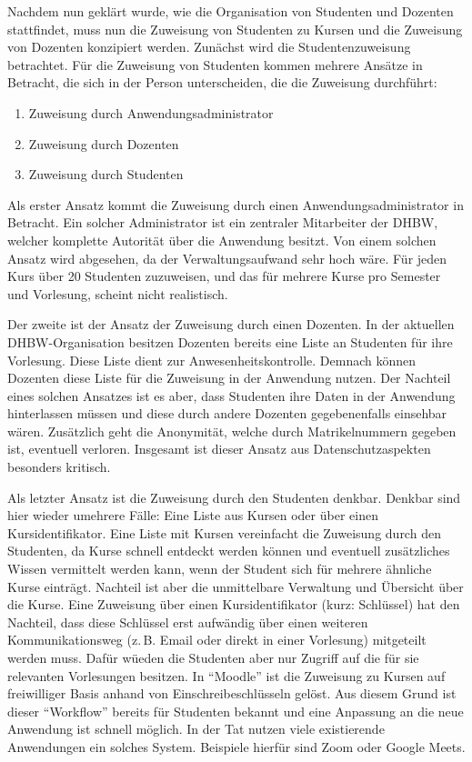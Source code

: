 Nachdem nun geklärt wurde, wie die Organisation von Studenten und Dozenten stattfindet, muss nun die Zuweisung von Studenten zu Kursen und die Zuweisung von Dozenten konzipiert werden.
Zunächst wird die Studentenzuweisung betrachtet.
Für die Zuweisung von Studenten kommen mehrere Ansätze in Betracht, die sich in der Person unterscheiden, die die Zuweisung durchführt:
\begin{enumerate}
    \item Zuweisung durch Anwendungsadministrator
    \item Zuweisung durch Dozenten
    \item Zuweisung durch Studenten
\end{enumerate}
Als erster Ansatz kommt die Zuweisung durch einen Anwendungsadministrator in Betracht.
Ein solcher Administrator ist ein zentraler Mitarbeiter der DHBW, welcher komplette Autorität über die Anwendung besitzt.
Von einem solchen Ansatz wird abgesehen, da der Verwaltungsaufwand sehr hoch wäre.
Für jeden Kurs über 20 Studenten zuzuweisen, und das für mehrere Kurse pro Semester und Vorlesung, scheint nicht realistisch.

Der zweite ist der Ansatz der Zuweisung durch einen Dozenten.
In der aktuellen DHBW-Organisation besitzen Dozenten bereits eine Liste an Studenten für ihre Vorlesung.
Diese Liste dient zur Anwesenheitskontrolle.
Demnach können Dozenten diese Liste für die Zuweisung in der Anwendung nutzen.
Der Nachteil eines solchen Ansatzes ist es aber, dass Studenten ihre Daten in der Anwendung hinterlassen müssen und diese durch andere Dozenten gegebenenfalls einsehbar wären.
Zusätzlich geht die Anonymität, welche durch Matrikelnummern gegeben ist, eventuell verloren.
Insgesamt ist dieser Ansatz aus Datenschutzaspekten besonders kritisch. %

Als letzter Ansatz ist die Zuweisung durch den Studenten denkbar.
Denkbar sind hier wieder umehrere Fälle: Eine Liste aus Kursen oder über einen Kursidentifikator.
Eine Liste mit Kursen vereinfacht die Zuweisung durch den Studenten, da Kurse schnell entdeckt werden können und eventuell zusätzliches Wissen vermittelt werden kann, wenn der Student sich für mehrere ähnliche Kurse einträgt.
Nachteil ist aber die unmittelbare Verwaltung und Übersicht über die Kurse.
Eine Zuweisung über einen Kursidentifikator (kurz: Schlüssel) hat den Nachteil, dass diese Schlüssel erst aufwändig über einen weiteren Kommunikationsweg (z.\,B. Email oder direkt in einer Vorlesung) mitgeteilt werden muss.
Dafür wüeden die  Studenten aber nur Zugriff auf die für sie relevanten Vorlesungen besitzen.
In \enquote{Moodle} ist die Zuweisung zu Kursen auf freiwilliger Basis anhand von Einschreibeschlüsseln gelöst.
Aus diesem Grund ist dieser \enquote{Workflow} bereits für Studenten bekannt und eine Anpassung an die neue Anwendung ist schnell möglich.
In der Tat nutzen viele existierende Anwendungen ein solches System.
Beispiele hierfür sind Zoom oder Google Meets.


